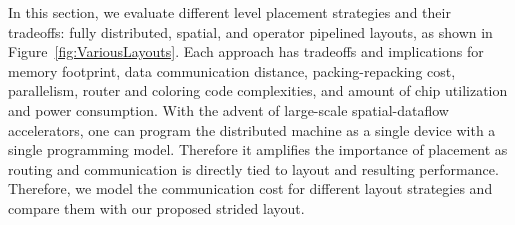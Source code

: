 \documentclass[sigconf]{acmart}
\begin{document}
In this section, we evaluate different level placement strategies and their tradeoffs: fully distributed, spatial, and operator pipelined layouts, as shown in Figure~\ref{fig:VariousLayouts}. Each approach has tradeoffs and implications for memory footprint, data communication distance, packing-repacking cost, parallelism, router and coloring code complexities, and amount of chip utilization and power consumption. With the advent of large-scale spatial-dataflow accelerators, one can program the distributed machine as a single device with a single programming model. Therefore it amplifies the importance of placement as routing and communication is directly tied to layout and resulting performance. Therefore, we model the communication cost for different layout strategies and compare them with our proposed strided layout.
\end{document}
